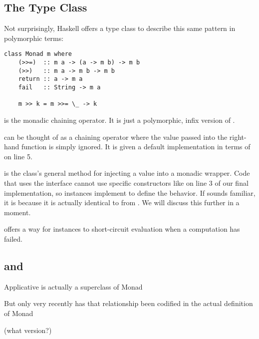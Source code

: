 \subsection{The  Type Class}

Not surprisingly, Haskell offers a type class to describe this same pattern in polymorphic terms:

\begin{lstlisting}
class Monad m where
    (>>=)  :: m a -> (a -> m b) -> m b
    (>>)   :: m a -> m b -> m b
    return :: a -> m a 
    fail   :: String -> m a

    m >> k = m >>= \_ -> k
\end{lstlisting}

\begin{notelist}
    \item \code{(>>=)} is the monadic chaining operator. It is just a polymorphic, infix version of .
    \item \code{(>>)} can be thought of as a chaining operator where the value passed into the right-hand function is simply ignored.
          It is given a default implementation in terms of \code{(>>=)} on line 5.
    \item {} is the  class's general method for injecting a value into a monadic wrapper. Code that uses
          the  interface cannot use specific constructors like  on line 3 of our final 
          implementation, so  instances implement  to define the behavior. If  sounds familiar,
          it is because it is actually identical to  from . We will discuss this further in a moment.
    \item {} offers a way for  instances to short-circuit evaluation when a computation has failed.
\end{notelist}

\subsection{ and }

\begin{notelist}
    \item Applicative is actually a superclass of Monad
    \item But only very recently has that relationship been codified in the actual definition of Monad
    \item (what version?)
\end{notelist}

